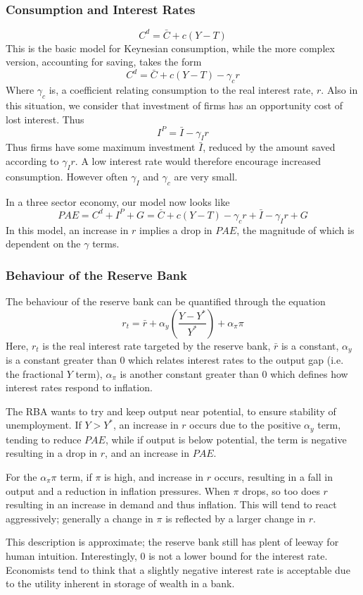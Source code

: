 \documentclass[12pt]{report}
\begin{document}
\begin{flushleft}
\subsubsection*{Consumption and Interest Rates}

\[C^d = \bar{C} + c(Y - T)\]
This is the basic model for Keynesian consumption, while the more complex
version, accounting for saving, takes the form
\[C^d = \bar{C} + c(Y - T) - \gamma_cr\]
Where \(\gamma_c\) is, a coefficient relating consumption to the
real interest rate, \(r\). Also in this situation, we consider that investment
of firms has an opportunity cost of lost interest. Thus
\[I^P = \bar{I} - \gamma_Ir\]
Thus firms have some maximum investment \(\bar{I}\), reduced by the amount
saved according to \(\gamma_Ir\). A low interest rate would therefore encourage
increased consumption. However often \(\gamma_I\) and \(\gamma_c\) are very
small. \par
In a three sector economy, our model now looks like
\[PAE = C^d + I^P + G =\bar{C} + c(Y - T) -\gamma_cr + \bar{I} -\gamma_Ir + G\] 
In this model, an increase in \(r\) implies a drop in \(PAE\), the magnitude of
which is dependent on the \(\gamma\) terms.

\subsubsection*{Behaviour of the Reserve Bank}

The behaviour of the reserve bank can be quantified through the equation
\[r_t = \bar{r} + \alpha_y\left(\frac{Y - Y^*}{Y^*}\right) + \alpha_\pi\pi\]
Here, \(r_t\) is the real interest rate targeted by the reserve bank,
\(\bar{r}\) is a constant, \(\alpha_y\) is a constant greater than \(0\) which
relates interest rates to the output gap (i.e. the fractional \(Y\) term),
\(\alpha_\pi\) is another constant greater than \(0\) which defines how
interest rates respond to inflation. \par
The RBA wants to try and keep output near potential, to ensure stability of
unemployment. If \(Y > Y^*\), an increase in \(r\) occurs due to the positive
\(\alpha_y\) term, tending to reduce \(PAE\), while if output is below
potential, the term is negative resulting in a drop in \(r\), and an increase
in \(PAE\). \par
For the \(\alpha_\pi\pi\) term, if \(\pi\) is high, and increase in \(r\)
occurs, resulting in a fall in output and a reduction in inflation pressures.
When \(\pi\) drops, so too does \(r\) resulting in an increase in demand and
thus inflation. This will tend to react aggressively; generally a change in
\(\pi\) is reflected by a larger change in \(r\). \par
This description is approximate; the reserve bank still has plent of leeway
for human intuition. Interestingly, \(0\) is not a lower bound for the interest
rate. Economists tend to think that a slightly negative interest rate is
acceptable due to the utility inherent in storage of wealth in a bank.


\end{flushleft}
\end{document}
